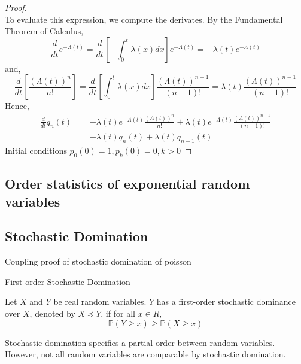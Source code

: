 \begin{proof}
$$	$$
	To evaluate this expression, we compute the derivates. By the Fundamental Theorem of Calculus,
	$$
		\frac{d}{dt} e^{-\Lambda (t)} 
		= \frac{d}{dt} \left[ - \int_0^t \lambda(x) dx \right] e^{-\Lambda (t)} 
		= - \lambda(t)  e^{-\Lambda (t)}
	$$
	and, 
	$$
		\frac{d}{dt} \left[ \frac{(\Lambda(t))^n}{n!} \right] 
		= \frac{d}{dt} \left[ \int_0^t \lambda(x) dx \right] \frac{(\Lambda(t))^{n-1}}{(n-1)!}
		= \lambda(t) \frac{(\Lambda(t))^{n-1}}{(n-1)!}
	$$
	Hence,
	\begin{align*}
		\frac{d}{dt} q_n(t) 
		&= - \lambda(t) e^{-\Lambda (t)} \frac{(\Lambda(t))^n}{n!} + \lambda(t) e^{-\Lambda (t)} \frac{(\Lambda(t))^{n-1}}{(n-1)!} \\
		&= -\lambda(t)q_n(t) + \lambda(t)q_{n-1}(t)
	\end{align*}
	Initial conditions
	$
		p_0(0) = 1, p_k(0) = 0, k > 0 
	$
\end{proof}



\subsection{Order statistics of exponential random variables}



\subsection{Stochastic Domination}
Coupling proof of stochastic domination of poisson 



\begin{definition}
	First-order Stochastic Domination

	\noindent
	Let $X$ and $Y$ be real random variables. $Y$ has a first-order stochastic dominance over $X$, denoted by $X \preceq Y$, if for all $x \in R$, 
	$$
		\mathbb{P}(Y \geq x) \geq \mathbb{P}(X \geq x)
	$$
\end{definition}

Stochastic domination specifies a partial order between random variables. However, not all random variables are comparable by stochastic domination. %


